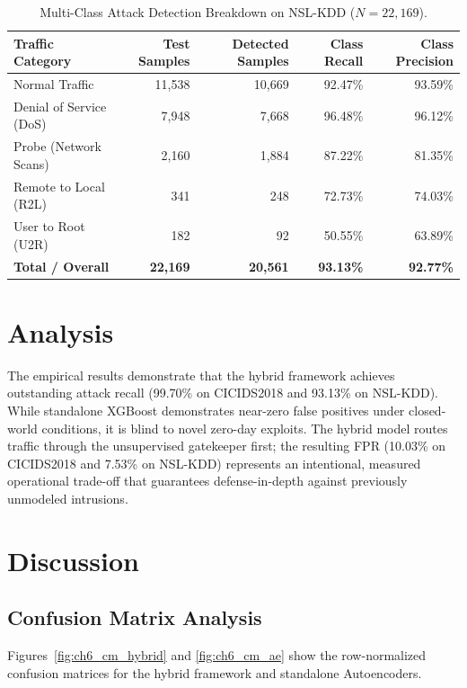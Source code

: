 \documentclass[12pt,a4paper]{report}
\begin{document}
\begin{table}[H]
\centering
\caption{Multi-Class Attack Detection Breakdown on NSL-KDD ($N = 22{,}169$).}
\label{tab:ch6_nslkdd}
\small
\begin{tabularx}{\columnwidth}{|Y|r|r|r|r|}
\hline
\textbf{Traffic Category} & \textbf{Test Samples} & \textbf{Detected Samples} & \textbf{Class Recall} & \textbf{Class Precision} \\
\hline
Normal Traffic & 11,538 & 10,669 & 92.47\% & 93.59\% \\
\hline
Denial of Service (DoS) & 7,948 & 7,668 & 96.48\% & 96.12\% \\
\hline
Probe (Network Scans) & 2,160 & 1,884 & 87.22\% & 81.35\% \\
\hline
Remote to Local (R2L) & 341 & 248 & 72.73\% & 74.03\% \\
\hline
User to Root (U2R) & 182 & 92 & 50.55\% & 63.89\% \\
\hline
\textbf{Total / Overall} & \textbf{22,169} & \textbf{20,561} & \textbf{93.13\%} & \textbf{92.77\%} \\
\hline
\end{tabularx}
\end{table}

\section{Analysis}
The empirical results demonstrate that the hybrid framework achieves outstanding attack recall (99.70\% on CICIDS2018 and 93.13\% on NSL-KDD). While standalone XGBoost demonstrates near-zero false positives under closed-world conditions, it is blind to novel zero-day exploits. The hybrid model routes traffic through the unsupervised gatekeeper first; the resulting FPR (10.03\% on CICIDS2018 and 7.53\% on NSL-KDD) represents an intentional, measured operational trade-off that guarantees defense-in-depth against previously unmodeled intrusions.

\section{Discussion}

\subsection{Confusion Matrix Analysis}
Figures~\ref{fig:ch6_cm_hybrid} and \ref{fig:ch6_cm_ae} show the row-normalized confusion matrices for the hybrid framework and standalone Autoencoders.
\end{document}

